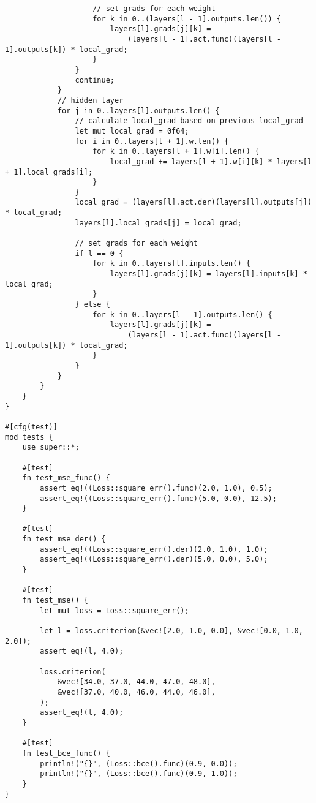 \begin{code}
\begin{verbatim}
                    // set grads for each weight
                    for k in 0..(layers[l - 1].outputs.len()) {
                        layers[l].grads[j][k] =
                            (layers[l - 1].act.func)(layers[l - 1].outputs[k]) * local_grad;
                    }
                }
                continue;
            }
            // hidden layer
            for j in 0..layers[l].outputs.len() {
                // calculate local_grad based on previous local_grad
                let mut local_grad = 0f64;
                for i in 0..layers[l + 1].w.len() {
                    for k in 0..layers[l + 1].w[i].len() {
                        local_grad += layers[l + 1].w[i][k] * layers[l + 1].local_grads[i];
                    }
                }
                local_grad = (layers[l].act.der)(layers[l].outputs[j]) * local_grad;
                layers[l].local_grads[j] = local_grad;

                // set grads for each weight
                if l == 0 {
                    for k in 0..layers[l].inputs.len() {
                        layers[l].grads[j][k] = layers[l].inputs[k] * local_grad;
                    }
                } else {
                    for k in 0..layers[l - 1].outputs.len() {
                        layers[l].grads[j][k] =
                            (layers[l - 1].act.func)(layers[l - 1].outputs[k]) * local_grad;
                    }
                }
            }
        }
    }
}

#[cfg(test)]
mod tests {
    use super::*;

    #[test]
    fn test_mse_func() {
        assert_eq!((Loss::square_err().func)(2.0, 1.0), 0.5);
        assert_eq!((Loss::square_err().func)(5.0, 0.0), 12.5);
    }

    #[test]
    fn test_mse_der() {
        assert_eq!((Loss::square_err().der)(2.0, 1.0), 1.0);
        assert_eq!((Loss::square_err().der)(5.0, 0.0), 5.0);
    }

    #[test]
    fn test_mse() {
        let mut loss = Loss::square_err();

        let l = loss.criterion(&vec![2.0, 1.0, 0.0], &vec![0.0, 1.0, 2.0]);
        assert_eq!(l, 4.0);

        loss.criterion(
            &vec![34.0, 37.0, 44.0, 47.0, 48.0],
            &vec![37.0, 40.0, 46.0, 44.0, 46.0],
        );
        assert_eq!(l, 4.0);
    }

    #[test]
    fn test_bce_func() {
        println!("{}", (Loss::bce().func)(0.9, 0.0));
        println!("{}", (Loss::bce().func)(0.9, 1.0));
    }
}

\end{verbatim}
\end{code}

